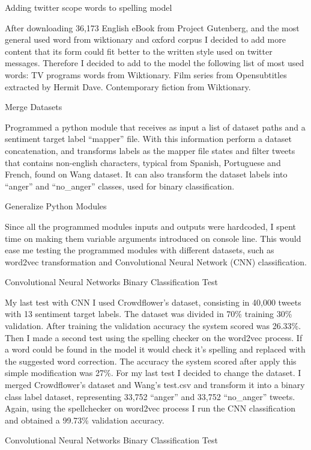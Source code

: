 Adding twitter scope words to spelling model

After downloading 36,173 English eBook from Project Gutenberg\cite{projectGutenberg}, and the most general used word from wiktionary and oxford corpus I decided to add more content that its form could fit better to the written style used on twitter messages. Therefore I decided to add to the model the following list of most used words:
TV programs words from Wiktionary.
Film series from Opensubtitles extracted by Hermit Dave\cite{openSubtitlesFL}.
Contemporary fiction from Wiktionary.

Merge Datasets

Programmed a python module that receives as input a list of dataset paths and a sentiment target label “mapper” file. 
With this information perform a dataset concatenation, and transforms labels as the mapper file states and filter tweets that contains non-english characters, typical from Spanish, Portuguese and French, found on Wang dataset.
It can also transform the dataset labels into “anger” and “no\_anger” classes, used for binary classification.

Generalize Python Modules

Since all the programmed modules inputs and outputs were hardcoded, I spent time on making them variable arguments introduced on console line.
This would ease me testing the programmed modules with different datasets, such as word2vec transformation and Convolutional Neural Network (CNN) classification.

Convolutional Neural Networks Binary Classification Test

My last test with CNN I used Crowdflower’s dataset, consisting in 40,000 tweets with 13 sentiment target labels. The dataset was divided in 70\% training 30\% validation. After training the validation accuracy the system scored was 26.33\%. Then I made a second test using the spelling checker on the word2vec process. If a word could be found in the model it would check it’s spelling and replaced with the suggested word correction. The accuracy the system scored after apply this simple modification was 27\%. For my last test I decided to change the dataset. I merged Crowdflower’s dataset and Wang’s test.csv and transform it into a binary class label dataset, representing 33,752 “anger” and 33,752 “no\_anger” tweets. Again, using the spellchecker on word2vec process I run the CNN classification and obtained a 99.73\% validation accuracy.

Convolutional Neural Networks Binary Classification Test

